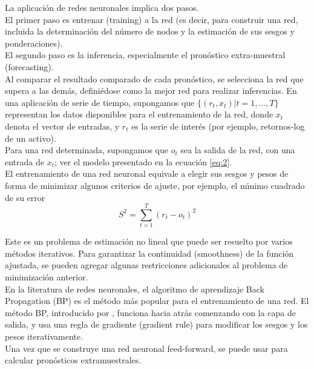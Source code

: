 	La aplicaci\'on de redes neuronales implica dos pasos. \\
	El primer paso es entrenar (training) a la red (es decir, para construir una red, incluida la determinaci\'on del n\'umero de nodos y la estimaci\'on de sus sesgos y ponderaciones). \\
	El segundo paso es la inferencia, especialmente el pron\'ostico extra-muestral (forecasting).\\
	Al comparar el resultado comparado de cada pron\'ostico, se selecciona la red que supera a las dem\'as, defini\'edose como la mejor red para realizar inferencias. 
	En una aplicaci\'on de serie de tiempo, supongamos que $\{(r_t, x_t) | t = 1, ..., T\}$ representan los datos disponibles para el entrenamiento de la red, donde $x_t$ denota el vector de entradas, y $r_t$ es la serie de inter\'es (por ejemplo, retornos-log de un activo). \\
	Para una red determinada, supongamos que $o_t$ sea la salida de la red, con una entrada de $x_t$; ver el modelo presentado en la ecuaci\'on \ref{eq:2}. \\
	El entrenamiento de una red neuronal equivale a elegir sus sesgos y pesos de forma de minimizar algunos criterios de ajuste, por ejemplo, el m\'{\i}nimo cuadrado de su error\\
	\begin{equation*} 
	S^2 =  \sum_{t=1}^ {T}  (r_t - o_t)^2 
	\end{equation*}

	
	Este es un problema de estimaci\'on no lineal que puede ser resuelto por varios m\'etodos iterativos. Para garantizar la continuidad (smoothness) de la funci\'on ajustada, se pueden agregar algunas restricciones adicionales al problema de minimizaci\'on anterior. \\
	En la literatura de redes neuronales, el algoritmo de aprendizaje Back Propagation (BP) es el m\'etodo m\'as popular para el entrenamiento de una red. El m\'etodo BP, introducido por \cite{bryson1969applied}, funciona hacia atr\'as comenzando con la capa de salida, y usa una regla de gradiente (gradient rule) para modificar los sesgos y los pesos iterativamente.\\
	Una vez que se construye una red neuronal feed-forward, se puede usar para calcular pron\'osticos extramuestrales.
	
